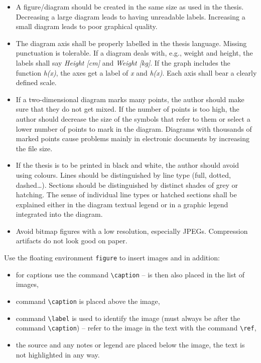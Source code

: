 \begin{itemize}

\item A figure/diagram should be created in the same size as used in the thesis. 
Decreasing a large diagram leads to having unreadable labels. Increasing a small 
diagram leads to poor graphical quality.

\item The diagram axis shall be properly labelled in the thesis language. 
Missing punctuation is tolerable. If a diagram deals with, e.g., weight and 
height, the labels shall say \emph{Height [cm]} and \emph{Weight [kg]}. If the 
graph includes the function \emph{h(x)}, the axes get a label of \emph{x} and 
\emph{h(x)}. Each axis shall bear a clearly defined scale. 

\item If a two-dimensional diagram marks many points, the author should make 
sure that they do not get mixed. If the number of points is too high, the author 
should decrease the size of the symbols that refer to them or select a lower 
number of points to mark in the diagram. Diagrams with thousands of marked 
points cause problems mainly in electronic documents by increasing the file 
size. 

\item If the thesis is to be printed in black and white, the author should avoid 
using colours. Lines should be distinguished by line type (full, dotted, 
dashed…). Sections should be distinguished by distinct shades of grey or 
hatching. The sense of individual line types or hatched sections shall be 
explained either in the diagram textual legend or in a graphic legend integrated 
into the diagram. 

\item Avoid bitmap figures with a low resolution, especially JPEGs. Compression 
artifacts do not look good on paper. 

\end{itemize}

Use the floating environment \verb|figure| to insert images and in addition:
\begin{itemize}
\item for captions use the command \verb|\caption| -- is then also placed in the list of images,
\item command \verb|\caption| is placed above the image,
\item command \verb|\label| is used to identify the image (must always be after the command \verb|\caption|) -- refer to the image in the text with the command \verb|\ref|,
\item the source and any notes or legend are placed below the image, the text is not highlighted in any way.
\end{itemize}

